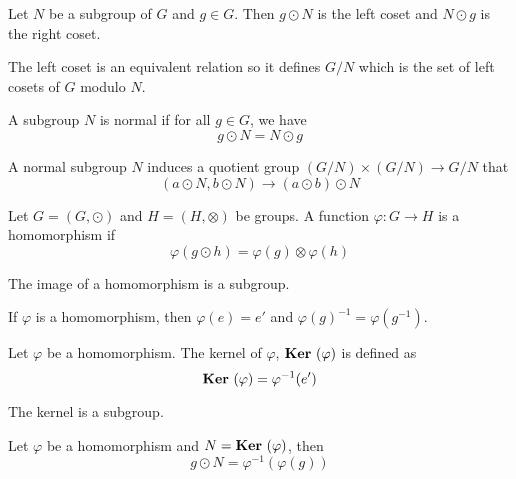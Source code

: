 \begin{definition}[coset]
    Let $N$ be a subgroup of $G$ and $g \in G$. Then $g \odot N$ is the left coset and $N \odot g$ is the right coset.
    
    The left coset is an equivalent relation so it defines $G/N$ which is the set of left cosets of $G$ modulo $N$.
\end{definition}

\begin{definition}[normal]
    A subgroup $N$ is normal if for all $g \in G$, we have 
    \begin{equation}
        g \odot N = N \odot g
    \end{equation}    
\end{definition}

\begin{definition}
    A normal subgroup $N$ induces a quotient group $(G/N) \times (G/N) \rightarrow G/N$ that 
    \begin{equation}
        (a \odot N, b \odot N) \rightarrow (a \odot b) \odot N
    \end{equation} 
\end{definition}

\begin{definition}[homomorphism]
    Let $G = (G, \odot)$ and $H = (H, \otimes)$ be groups. A function $\varphi: G \rightarrow H$ is a homomorphism if 
    \begin{equation}
        \varphi(g \odot h) = \varphi(g) \otimes \varphi(h)
    \end{equation}
    
    The image of a homomorphism is a subgroup.
\end{definition}

\begin{theorem}
    If $\varphi$ is a homomorphism, then $\varphi(e) = e'$ and $\varphi(g)^{-1} = \varphi(g^{-1})$.
\end{theorem}

\begin{definition}[kernel]
    Let $\varphi$ be a homomorphism. The kernel of $\varphi$, $\displaystyle \mathop{\bf Ker\/}~( \varphi )$ is defined as
    \begin{equation}
        \displaystyle \mathop{\bf Ker\/}~( \varphi ) = \varphi^{-1}(e')
    \end{equation}
    
    The kernel is a subgroup.
\end{definition}

\begin{theorem}
Let $\varphi$ be a homomorphism and $N = \displaystyle \mathop{\bf Ker\/}~( \varphi )$, then
\begin{equation}
    g \odot N = \varphi^{-1}\left(\varphi(g)\right)
\end{equation}
\end{theorem}

